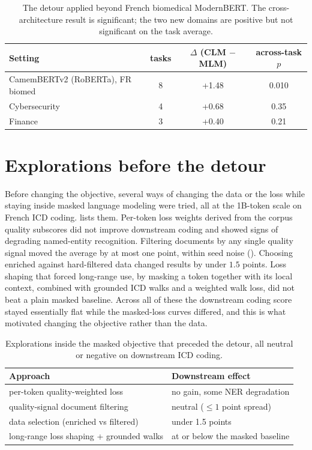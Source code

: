 \begin{table}[t]
  \centering
  \small
  \setlength{\tabcolsep}{12pt}
  \begin{tabular}{@{}lccc@{}}
    \toprule
    Setting & tasks & $\Delta$ (CLM $-$ MLM) & across-task $p$ \\
    \midrule
    CamemBERTv2 (RoBERTa), FR biomed & 8 & +1.48 & 0.010 \\
    Cybersecurity                    & 4 & +0.68 & 0.35 \\
    Finance                          & 3 & +0.40 & 0.21 \\
    \bottomrule
  \end{tabular}
\caption{The detour applied beyond French biomedical ModernBERT. The cross-architecture result is significant; the two new domains are positive but not significant on the task average.}
\label{tab:clm-generality}
\end{table}

\section{Explorations before the detour}

Before changing the objective, several ways of changing the data or the loss while
staying inside masked language modeling were tried, all at the 1B-token scale on French
ICD coding.  lists them. Per-token loss weights derived from the
corpus quality subscores did not improve downstream coding and showed signs of degrading
named-entity recognition. Filtering documents by any single quality signal moved the
average by at most one point, within seed noise (). Choosing enriched against hard-filtered
data changed results by under $1.5$ points. Loss shaping that forced long-range use, by
masking a token together with its local context, combined with grounded ICD walks and a
weighted walk loss, did not beat a plain masked baseline. Across all of these the
downstream coding score stayed essentially flat while the masked-loss curves differed,
and this is what motivated changing the objective rather than the data.

\begin{table}[t]
  \centering
  \small
  \setlength{\tabcolsep}{12pt}
  \begin{tabular}{@{}ll@{}}
    \toprule
    Approach & Downstream effect \\
    \midrule
    per-token quality-weighted loss        & no gain, some NER degradation \\
    quality-signal document filtering       & neutral ($\leq 1$ point spread) \\
    data selection (enriched vs filtered)    & under 1.5 points \\
    long-range loss shaping + grounded walks & at or below the masked baseline \\
    \bottomrule
  \end{tabular}
\caption{Explorations inside the masked objective that preceded the detour, all neutral or negative on downstream ICD coding.}
\label{tab:clm-preclm}
\end{table}

